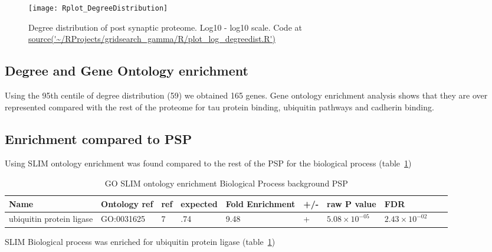 \begin{figure}
    \texttt{[image: Rplot\_DegreeDistribution]}
    \caption{Degree distribution of post synaptic proteome. Log10 - log10 scale. Code at \url{source('~/RProjects/gridsearch_gamma/R/plot_log_degreedist.R') }}
    \label{fig:Degree distribution of post synaptic proteome. Log10 - log10 scale.}
\end{figure}

\subsection{Degree and Gene Ontology enrichment}

Using the 95th centile of degree distribution (59) we obtained 165 genes. Gene ontology enrichment analysis shows that they are over represented compared with the rest of the proteome for tau protein binding, ubiquitin pathways and cadherin binding.

\subsection{Enrichment compared to PSP}

Using SLIM ontology enrichment was found compared to the rest of the PSP for the biological process (table~\ref{tab:GO SLIM ontology enrichment Biological Process background PSP})

\begin{table}
\centering
\begin{adjustbox}{max width=\textwidth}
\begin{tabular}{llllllllll}
Name & Ontology ref &ref &	expected &	Fold Enrichment &	+/-	&raw P value&FDR\\
\hline
ubiquitin protein ligase & GO:0031625&  	7 &  	.74 & 	9.48 &  	+ & 	$5.08\times 10^{-05}$ & 	$2.43 \times 10^{-02}$\\
\end{tabular}
\end{adjustbox}
\caption{GO SLIM ontology enrichment Biological Process background PSP}
\label{tab:GO SLIM ontology enrichment Biological Process background PSP}
\end{table}



SLIM Biological process was enriched for ubiquitin protein ligase (table~\ref{tab:GO SLIM ontology enrichment Biological Process background PSP})%






